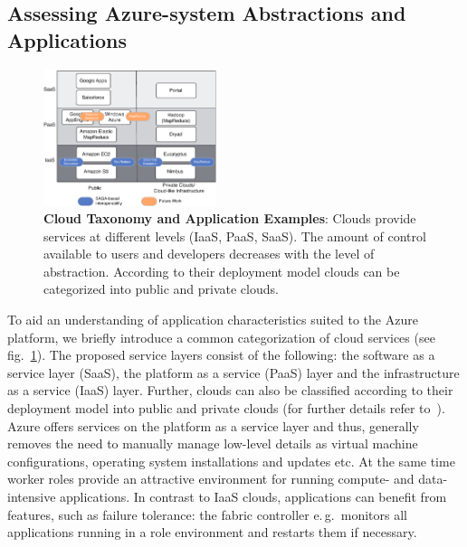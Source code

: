 \documentclass[3p,twocolumn]{elsarticle}
\begin{document}
\subsection{Assessing Azure-system Abstractions and Applications}
\begin{figure}[ht]
 \centering
 \upp\upp
 \includegraphics[width=0.45\textwidth]{figures/cloud_ontology_apps}
 \caption{\footnotesize \textbf{Cloud Taxonomy and Application Examples}:
   Clouds provide services at different levels (IaaS, PaaS, SaaS).
   The amount of control available to users and developers decreases
   with the level of abstraction. According to their deployment model
   clouds can be categorized into public and private clouds.
   \label{fig:cloud_layers}}
   \upp\upp
\end{figure}

To aid an understanding of application characteristics suited to the
Azure platform, we briefly introduce a common categorization of cloud
services (see fig.~\ref{fig:cloud_layers}). The proposed service
layers consist of the following: the software as a service layer
(SaaS), the platform as a service (PaaS) layer and the infrastructure
as a service (IaaS) layer. Further, clouds can also be classified
according to their deployment model into public and private clouds
(for further details refer to~\cite{Jha:2010kx}).  Azure offers
services on the platform as a service layer and thus, generally
removes the need to manually manage low-level details as virtual
machine configurations, operating system installations and updates
etc.  At the same time worker roles provide an attractive environment
for running compute- and data-intensive applications. In contrast to
IaaS clouds, applications can benefit from features, such as failure
tolerance: the fabric controller e.\,g.\ monitors all applications
running in a role environment and restarts them if necessary.

\end{document}
